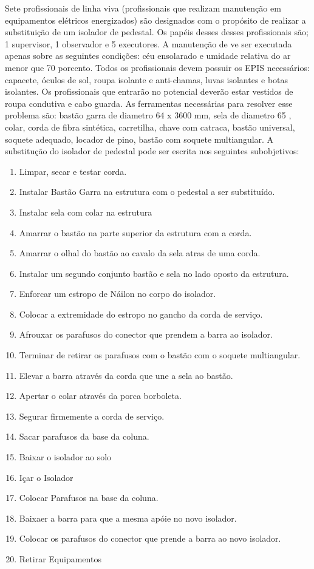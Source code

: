 \documentclass[12pt]{article}
\begin{document}
Sete profissionais de linha viva (profissionais que realizam manutenção em equipamentos elétricos energizados) são designados com o propósito de realizar a substituição de um isolador de pedestal. Os papéis desses desses profissionais são; 1 supervisor, 1 observador e 5 executores. A manutenção de ve ser executada apenas sobre as seguintes condições: céu ensolarado e umidade relativa do ar menor que 70 porcento. Todos os profissionais devem possuir os EPIS necessários: capacete, óculos de sol, roupa isolante e anti-chamas, luvas isolantes e botas isolantes. Os profissionais que entrarão no potencial deverão estar vestidos de roupa condutiva e cabo guarda. As ferramentas necessárias para resolver esse problema são: bastão garra de diametro 64 x 3600 mm, sela de diametro 65 , colar, corda de fibra sintética, carretilha, chave com catraca, bastão universal, soquete adequado, locador de pino, bastão com soquete multiangular. A substitução do isolador de pedestal pode ser escrita nos seguintes subobjetivos: 


\begin{enumerate}
	\item Limpar, secar e testar corda.
	\item Instalar Bastão Garra na estrutura com o pedestal a ser substituído.
	\item Instalar sela com colar na estrutura
	\item Amarrar o bastão na parte superior da estrutura com a corda.
	\item Amarrar o olhal do bastão ao cavalo da sela atras de uma corda.
	\item Instalar um segundo conjunto bastão e sela no lado oposto da estrutura.
	\item Enforcar um estropo de Náilon no corpo do isolador.
	\item Colocar a extremidade do estropo no gancho da corda de serviço.
	\item Afrouxar os parafusos do conector que prendem a barra ao isolador.
	\item Terminar de retirar os parafusos com o bastão com o soquete multiangular.
	\item Elevar a barra através da corda que une a sela ao bastão.
	\item Apertar o colar através da porca borboleta.
	\item Segurar firmemente a corda de serviço.
	\item Sacar parafusos da base da coluna.
	\item Baixar o isolador ao solo
	\item Içar o Isolador
	\item Colocar Parafusos na base da coluna.
	\item Baixaer a barra para que a mesma apóie no novo isolador.
	\item Colocar os parafusos do conector que prende a barra ao novo isolador. 
	\item Retirar Equipamentos
\end{enumerate}
\end{document}
